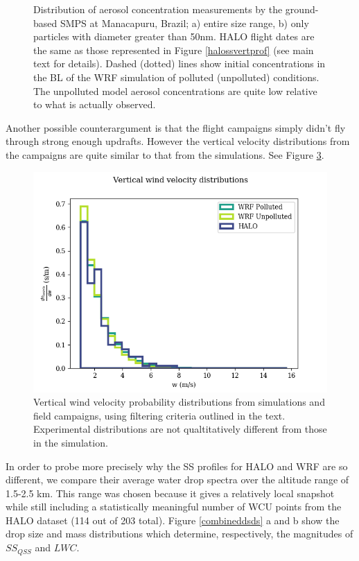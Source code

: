 \documentclass{article}
\begin{document}
\begin{figure}[ht]
\begin{subfigure}{0.7\textwidth}
		\label{goamazonuap50hist}
		\caption{}
	\end{subfigure}
	\caption{Distribution of aerosol concentration measurements by the ground-based SMPS at Manacapuru, Brazil; a) entire size range, b) only particles with diameter greater than 50nm. HALO flight dates are the same as those represented in Figure \ref{halossvertprof} (see main text for details). Dashed (dotted) lines show initial concentrations in the BL of the WRF simulation of polluted (unpolluted) conditions. The unpolluted model aerosol concentrations are quite low relative to what is actually observed.}
	\label{goamazonhist}
\end{figure}

Another possible counterargument is that the flight campaigns simply didn't fly through strong enough updrafts. However the vertical velocity distributions from the campaigns are quite similar to that from the simulations. See Figure \ref{combinedwhist}. 

\begin{figure}[ht]
    \centering
    \includegraphics[width=12cm]{wrf/combined_w_hist_figure.png}
    \caption{Vertical wind velocity probability distributions from simulations and field campaigns, using filtering criteria outlined in the text. Experimental distributions are not qualtitatively different from those in the simulation.}
    \label{combinedwhist}
\end{figure}

In order to probe more precisely why the SS profiles for HALO and WRF are so different, we compare their average water drop spectra over the altitude range of 1.5-2.5 km. This range was chosen because it gives a relatively local snapshot while still including a statistically meaningful number of WCU points from the HALO dataset (114 out of 203 total). Figure \ref{combineddsds} a and b show the drop size and mass distributions which determine, respectively, the magnitudes of $SS_{QSS}$ and $LWC$. 
\end{document}
